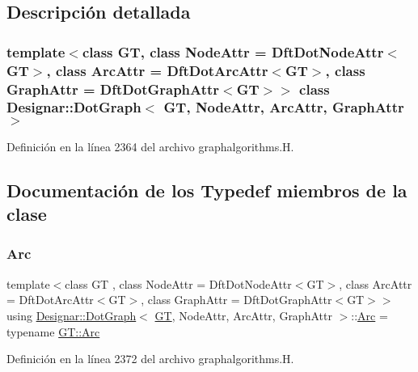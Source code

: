 \subsection{Descripción detallada}
\subsubsection*{template$<$class GT, class Node\+Attr = Dft\+Dot\+Node\+Attr$<$\+G\+T$>$, class Arc\+Attr = Dft\+Dot\+Arc\+Attr$<$\+G\+T$>$, class Graph\+Attr = Dft\+Dot\+Graph\+Attr$<$\+G\+T$>$$>$\newline
class Designar\+::\+Dot\+Graph$<$ G\+T, Node\+Attr, Arc\+Attr, Graph\+Attr $>$}



Definición en la línea 2364 del archivo graphalgorithms.\+H.



\subsection{Documentación de los \textquotesingle{}Typedef\textquotesingle{} miembros de la clase}
\mbox{\label{class_designar_1_1_dot_graph_a72979d4373928269dc67fb369548701d}} 
\subsubsection{\texorpdfstring{Arc}{Arc}}
{\footnotesize\ttfamily template$<$class GT , class Node\+Attr  = Dft\+Dot\+Node\+Attr$<$\+G\+T$>$, class Arc\+Attr  = Dft\+Dot\+Arc\+Attr$<$\+G\+T$>$, class Graph\+Attr  = Dft\+Dot\+Graph\+Attr$<$\+G\+T$>$$>$ \\
using \hyperlink{class_designar_1_1_dot_graph}{Designar\+::\+Dot\+Graph}$<$ \hyperlink{demo-buildgraph_8_c_a3001c40d2c31ca87ed96cd7d1334a55e}{GT}, Node\+Attr, Arc\+Attr, Graph\+Attr $>$\+::\hyperlink{class_designar_1_1_dot_graph_a72979d4373928269dc67fb369548701d}{Arc} =  typename \hyperlink{class_designar_1_1_graph_a74c730ef4ce2d20f998d72bd25c2b5bf}{G\+T\+::\+Arc}}



Definición en la línea 2372 del archivo graphalgorithms.\+H.

\mbox{\label{class_designar_1_1_dot_graph_a591d14a84a622be5bdcc190543c8ca46}} 
